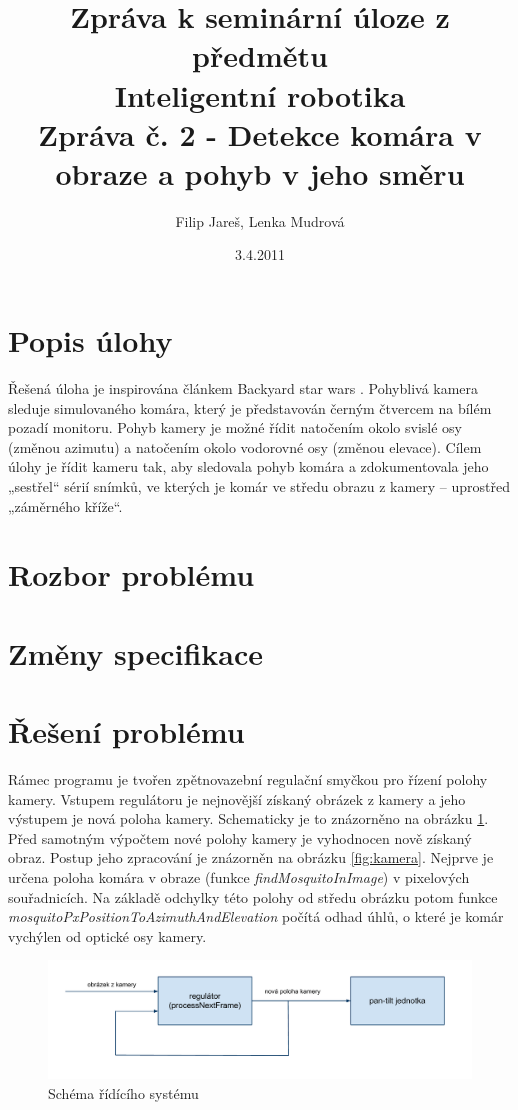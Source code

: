 \documentclass[a4paper,10pt]{article}
\title{Zpráva k seminární úloze z předmětu\\ Inteligentní robotika \\ {\small Zpráva č. 2 - Detekce komára v obraze a pohyb v jeho směru}}
\author{Filip Jareš, Lenka Mudrová}
\date{3.4.2011}
\begin{document}
\maketitle
\newpage


\section{Popis úlohy}

Řešená úloha je inspirována článkem Backyard star wars \cite{clanek}. Pohyblivá kamera sleduje simulovaného komára, který je představován černým čtvercem na bílém pozadí monitoru. Pohyb kamery je možné řídit natočením okolo svislé osy (změnou azimutu) a natočením okolo vodorovné osy (změnou elevace). Cílem úlohy je řídit kameru tak, aby sledovala pohyb komára a zdokumentovala jeho „sestřel“ sérií snímků, ve kterých je komár ve středu obrazu z kamery – uprostřed „záměrného kříže“.

\section{Rozbor problému}

\section{Změny specifikace}

\section{Řešení problému}

Rámec programu je tvořen zpětnovazební regulační smyčkou pro řízení polohy kamery. Vstupem regulátoru je nejnovější získaný obrázek z kamery a jeho výstupem je nová poloha kamery. Schematicky je to znázorněno na obrázku \ref{fig:rid_system}.
Před samotným výpočtem nové polohy kamery je vyhodnocen nově získaný obraz. Postup jeho zpracování je znázorněn na obrázku \ref{fig:kamera}.
Nejprve je určena poloha komára v obraze (funkce \textit{findMosquitoInImage}) v pixelových souřadnicích. Na základě odchylky této polohy od středu obrázku potom funkce \textit{mosquitoPxPositionToAzimuthAndElevation} počítá odhad úhlů, o které je komár vychýlen od optické osy kamery.

\begin{figure}[!h]
    \centering
     \includegraphics[width=1\columnwidth]{pics/schema_ridiciho_systemu}
     \caption{Schéma řídícího systému\label{fig:rid_system}}
\end{figure}
\end{document}
